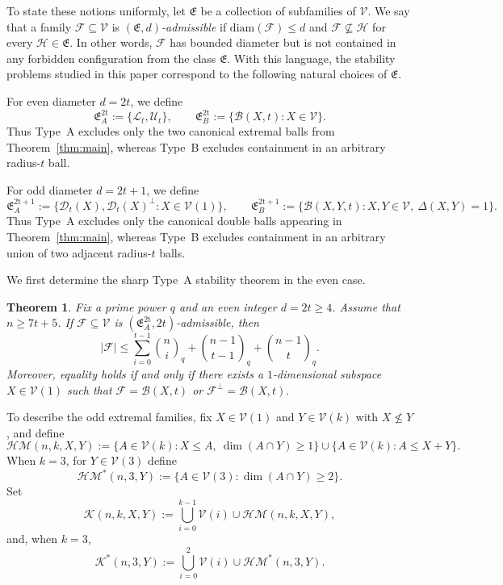 \documentclass[11pt]{article}
\newtheorem{theorem}{Theorem}[section]
\theoremstyle{definition}
\newcommand{\qbinom}[2]{\genfrac{(}{)}{0pt}{}{#1}{#2}_q}
\newcommand{\diam}{\mathrm{diam}}
\begin{document}
To state these notions uniformly, let $\mathfrak E$ be a collection of subfamilies of $\mathcal V$. We say that a family $\mathcal F\subseteq\mathcal V$ is \emph{$(\mathfrak{E},d)$-admissible} if
\(
\diam(\mathcal F)\le d\) and
\(
\mathcal F\not\subseteq \mathcal H\) for every
\(\mathcal H\in\mathfrak E.
\)
In other words, $\mathcal F$ has bounded diameter but is not contained in any forbidden configuration from the class $\mathfrak E$. With this language, the stability problems studied in this paper correspond to the following natural choices of $\mathfrak E$.

For even diameter $d=2t$, we define
\[
\mathfrak E_A^{\mathrm{2t}}:=\{\mathcal L_t,\mathcal U_t\},
\qquad
\mathfrak E_B^{\mathrm{2t}}:=\{\mathcal B(X,t):X\in\mathcal V\}.
\]
Thus Type~A excludes only the two canonical extremal balls from Theorem~\ref{thm:main}, whereas Type~B excludes containment in an arbitrary radius-$t$ ball.

For odd diameter $d=2t+1$, we define
\[
\mathfrak E_A^{\mathrm{2t+1}}
:=
\{\mathcal D_t(X),\mathcal D_t(X)^\perp:X\in\mathcal V(1)\},
\qquad
\mathfrak E_B^{\mathrm{2t+1}}
:=
\{\mathcal B(X,Y,t):X,Y\in\mathcal V,\ \Delta(X,Y)=1\}.
\]
Thus Type~A excludes only the canonical double balls appearing in Theorem~\ref{thm:main}, whereas Type~B excludes containment in an arbitrary union of two adjacent radius-$t$ balls.

We first determine the sharp Type~A stability theorem in the even case.

\begin{theorem}\label{thm:stab-typeA-even}
Fix a prime power $q$ and an even integer $d=2t\ge 4$.
Assume that $n\ge 7t+5$.
If $\mathcal F\subseteq \mathcal V$ is $(\mathfrak E_A^{\mathrm{2t}},2t)$-admissible, then
\[
|\mathcal F|
\le
\sum_{i=0}^{t-1}\qbinom{n}{i}
+
\qbinom{n-1}{t-1}
+
\qbinom{n-1}{t}.
\]
Moreover, equality holds if and only if there exists a $1$-dimensional subspace
$X\in\mathcal V(1)$ such that
\(
\mathcal F=\mathcal B(X,t)\)
or
\(
\mathcal F^\perp=\mathcal B(X,t).
\)
\end{theorem}

To describe the odd extremal families, fix $X\in\mathcal V(1)$ and $Y\in\mathcal V(k)$ with $X\not\le Y$, and define
\[
\mathcal{HM}(n,k,X,Y)
:=
\{A\in \mathcal V(k): X\le A,\ \dim(A\cap Y)\ge 1\}
\cup
\{A\in \mathcal V(k): A\le X+Y\}.
\]
When $k=3$, for $Y\in\mathcal V(3)$ define
\[
\mathcal{HM}^*(n,3,Y)
:=
\{A\in \mathcal V(3): \dim(A\cap Y)\ge 2\}.
\]
Set
\[
\mathcal K(n,k,X,Y)
:=
\bigcup_{i=0}^{k-1}\mathcal V(i)\cup \mathcal{HM}(n,k,X,Y),
\]
and, when $k=3$,
\[
\mathcal K^*(n,3,Y)
:=
\bigcup_{i=0}^{2}\mathcal V(i)\cup \mathcal{HM}^*(n,3,Y).
\]
\end{document}

